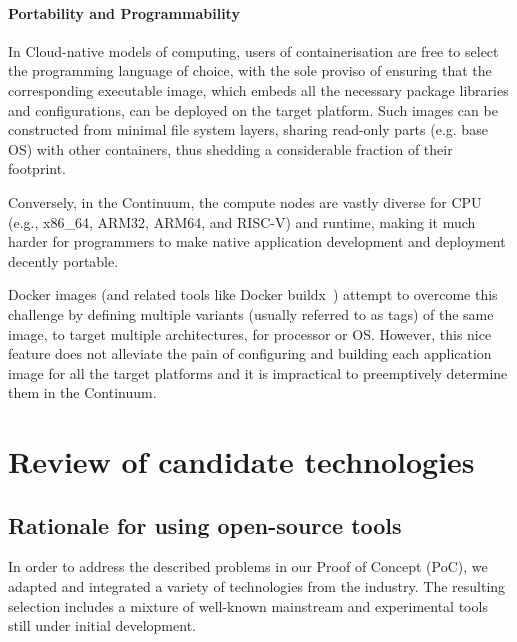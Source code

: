 \paragraph{Portability and Programmability}\label{p:portability-and-programmability}
In Cloud-native models of computing, users of containerisation are free to select the programming language of choice, with the sole proviso of ensuring that the corresponding executable image, which embeds all the necessary package libraries and configurations, can be deployed on the target platform. 
Such images can be constructed from minimal file system layers, sharing read-only parts (e.g. base OS) with other containers, thus shedding a considerable fraction of their footprint. 

Conversely, in the Continuum, the compute nodes are vastly diverse for CPU (e.g., x86\_64, ARM32, ARM64, and RISC-V) and runtime, making it much harder for programmers to make native application development and deployment decently portable. 

Docker images (and related tools like Docker buildx~\cite{docker-buildx}) attempt to overcome this challenge by defining multiple variants (usually referred to as tags) of the same image, to target multiple architectures, for processor or OS. 
However, this nice feature does not alleviate the pain of configuring and building each application image for all the target platforms and it is impractical to preemptively determine them in the Continuum.


\section{Review of candidate technologies}\label{sec:technology-selection}

\subsection{Rationale for using open-source tools}

In order to address the described problems in our Proof of Concept (PoC), we adapted and integrated a variety of technologies from the industry. The resulting selection includes a mixture of well-known mainstream and experimental tools still under initial development.

